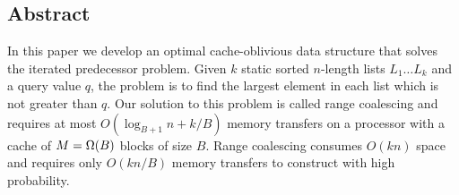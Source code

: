 \subsection*{Abstract}
In this paper we develop an optimal cache-oblivious data structure that solves the
iterated predecessor problem. Given $k$ static sorted $n$-length lists $L_1 \ldots L_k$
and a query value $q$, the  problem is to find the largest
element in each list which is not greater than $q$.  Our solution to this problem
is called range coalescing and requires at most $O(\log_{B+1} n + k/B)$ memory
transfers on a processor with a cache of $M = \Omega \mathopen{}\left(B\right)\mathclose{}$ blocks of size $B$.
Range coalescing consumes $O(kn)$ space and requires only $O(kn/B)$ memory transfers
to construct with high probability.